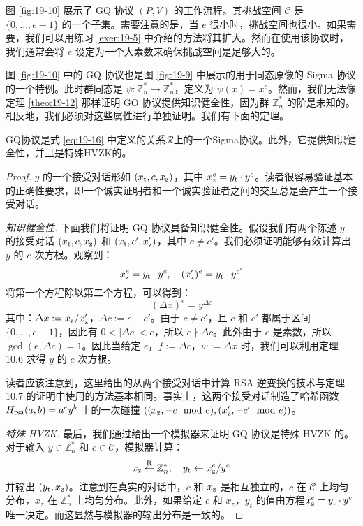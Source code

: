 图 \ref{fig:19-10} 展示了 GQ 协议 $(P,V)$ 的工作流程。其挑战空间 $\mathcal{C}$ 是 $\{0,\dots,e-1\}$ 的一个子集。需要注意的是，当 $e$ 很小时，挑战空间也很小。如果需要，我们可以用练习 \ref{exer:19-5} 中介绍的方法将其扩大。然而在使用该协议时，我们通常会将 $e$ 设定为一个大素数来确保挑战空间是足够大的。

图 \ref{fig:19-10} 中的 GQ 协议也是图 \ref{fig:19-9} 中展示的用于同态原像的 Sigma 协议的一个特例。此时群同态是 $\psi:\mathbb{Z}_n^*\to\mathbb{Z}_n^*$，定义为 $\psi(x)=x^e$。然而，我们无法像定理 \ref{theo:19-12} 那样证明 GO 协议提供知识健全性，因为群 $\mathbb{Z}_n^*$ 的阶是未知的。相反地，我们必须对这些属性进行单独证明。我们有下面的定理。

\begin{theorem}
GQ协议是式 \ref{eq:19-16} 中定义的关系$\mathcal R$上的一个Sigma协议。此外，它提供知识健全性，并且是特殊HVZK的。
\end{theorem}

\begin{proof}
$y$ 的一个接受对话形如 $(x_{\rm t},c,x_{\rm z})$，其中 $x^e_{\rm z}=y_{\rm t}\cdot y^c$。读者很容易验证基本的正确性要求，即一个诚实证明者和一个诚实验证者之间的交互总是会产生一个接受对话。

\vspace{5pt}

\noindent
\emph{知识健全性.}
下面我们将证明 GQ 协议具备知识健全性。假设我们有两个陈述 $y$ 的接受对话 $(x_{\rm t},c,x_{\rm z})$ 和 $(x_{\rm t},c',x_{\rm z}')$，其中 $c\neq c'$。我们必须证明能够有效计算出 $y$ 的 $e$ 次方根。观察到：
\[
x^e_{\rm z}=y_{\rm t}\cdot y^c,
\quad
(x_{\rm z}')^e=y_{\rm t}\cdot y^{c'}
\]
将第一个方程除以第二个方程，可以得到：
\[
(\Delta x)^e=y^{\Delta c}
\]
其中：$\Delta x:={x_{\rm z}}/{x_{\rm z}'}$，$\Delta c:=c-c'$。由于 $c\neq c'$，且 $c$ 和 $c'$ 都属于区间 $\{0,\dots,e-1\}$，因此有 $0<|\Delta c|<e$，所以 $e\nmid\Delta c$。此外由于 $e$ 是素数，所以 $\gcd(e,\Delta c)=1$。因此当给定 $e$，$f:=\Delta c$，$w:=\Delta x$ 时，我们可以利用定理 10.6 求得 $y$ 的 $e$ 次方根。

读者应该注意到，这里给出的从两个接受对话中计算 RSA 逆变换的技术与定理 10.7 的证明中使用的方法基本相同。事实上，这两个接受对话制造了哈希函数 $H_{\rm rsa}(a,b)=a^ey^b$ 上的一次碰撞 $((x_{\rm z},-c\mod e),(x_{\rm z}',-c'\mod e))$。

\vspace{5pt}

\noindent
\emph{特殊 HVZK.}
最后，我们通过给出一个模拟器来证明 GQ 协议是特殊 HVZK 的。对于输入 $y\in\mathbb{Z}_n^*$ 和 $c\in\mathcal{C}$，模拟器计算：
\[
x_{\rm z}\overset{\rm R}\leftarrow\mathbb{Z}_n^*,
\quad
y_{\rm t}\leftarrow{x_{\rm z}^e}/{y^c}
\]
并输出 $(y_{\rm t},x_{\rm z})$。注意到在真实的对话中，$c$ 和 $x_{\rm z}$ 是相互独立的，$c$ 在 $\mathcal{C}$ 上均匀分布，$x_z$ 在 $\mathbb{Z}_n^*$ 上均匀分布。此外，如果给定 $c$ 和 $x_z$，$y_t$ 的值由方程$x^e_{\rm z}=y_{\rm t}\cdot y^c$唯一决定。而这显然与模拟器的输出分布是一致的。
\end{proof}